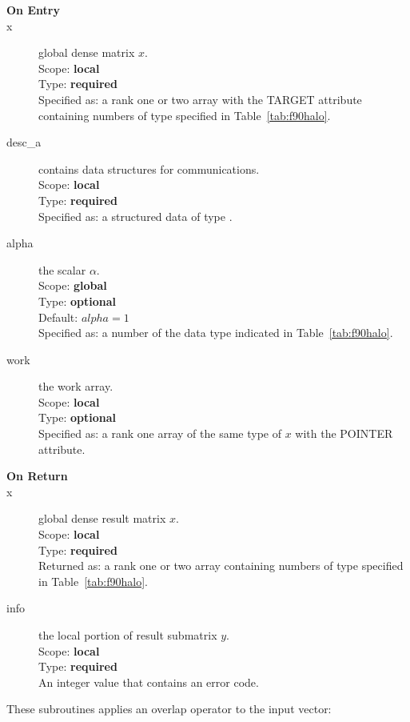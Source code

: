 \begin{description}
\item[\bf On Entry]
\item[x] global dense matrix $x$.\\
Scope: {\bf local} \\
Type: {\bf required} \\
Specified as:  a rank one or two array with the TARGET attribute
containing numbers of type specified in
Table~\ref{tab:f90halo}.
\item[desc\_a] contains data structures for communications.\\
Scope: {\bf local} \\
Type: {\bf required}\\
Specified as: a structured data of type \descdata.
\item[alpha] the scalar $\alpha$.\\
Scope: {\bf global} \\
Type: {\bf optional} \\
Default: $alpha = 1 $\\	
Specified as: a number of the data type indicated in Table~\ref{tab:f90halo}.
\item[work] the work array. \\
Scope: {\bf local} \\
Type: {\bf optional}\\
Specified as: a rank one array of the same type of $x$ with the
POINTER attribute.

\item[\bf On Return] 
\item[x] global dense result matrix $x$.\\
Scope: {\bf local} \\
Type: {\bf required} \\
Returned as:  a rank one or two array 
containing numbers of type specified in
Table~\ref{tab:f90halo}.
\item[info] the local portion of result submatrix $y$.\\
Scope: {\bf local} \\
Type: {\bf required} \\
An integer value that contains an error code. 
\end{description}
%
%



These subroutines applies an overlap operator to the input vector:

